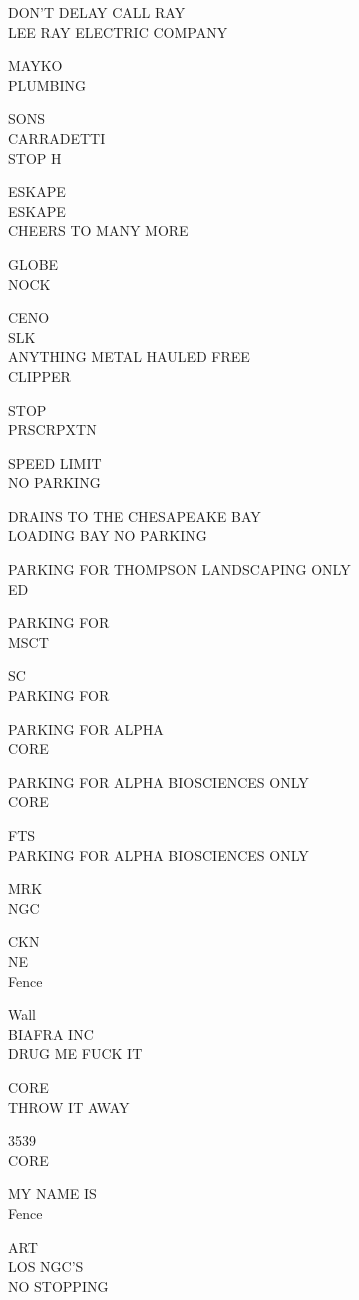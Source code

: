 \documentclass[10pt,letterpaper]{article}
\begin{document}
DON'T DELAY CALL RAY\\
LEE RAY ELECTRIC COMPANY

MAYKO\\
PLUMBING

SONS\\
CARRADETTI\\
STOP H

ESKAPE\\
ESKAPE\\
CHEERS TO MANY MORE

GLOBE\\
NOCK

CENO\\
SLK\\
ANYTHING METAL HAULED FREE\\
CLIPPER

STOP\\
PRSCRPXTN

SPEED LIMIT\\
NO PARKING

DRAINS TO THE CHESAPEAKE BAY\\
LOADING BAY NO PARKING

PARKING FOR THOMPSON LANDSCAPING ONLY\\
ED

PARKING FOR\\
MSCT

SC\\
PARKING FOR

PARKING FOR ALPHA\\
CORE

PARKING FOR ALPHA BIOSCIENCES ONLY\\
CORE

FTS\\
PARKING FOR ALPHA BIOSCIENCES ONLY

MRK\\
NGC

CKN\\
NE\\
Fence

Wall\\
BIAFRA INC\\
DRUG ME FUCK IT

CORE\\
THROW IT AWAY

3539\\
CORE

MY NAME IS\\
Fence

ART\\
LOS NGC'S\\
NO STOPPING
\end{document}
